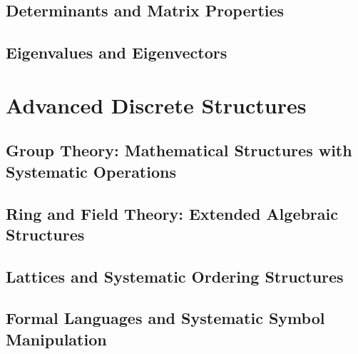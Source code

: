 \documentclass[12pt, oneside, openany]{book}
\let\oldchapter\chapter
\renewcommand{\chapter}{
	\cleardoublepage
	\thispagestyle{chapter}
	\oldchapter
}
\begin{document}
\section{Determinants and Matrix Properties}

\section{Eigenvalues and Eigenvectors}


\chapter{Advanced Discrete Structures}

\section{Group Theory: Mathematical Structures with Systematic Operations}

\section{Ring and Field Theory: Extended Algebraic Structures}

\section{Lattices and Systematic Ordering Structures}

\section{Formal Languages and Systematic Symbol Manipulation}
\end{document}
